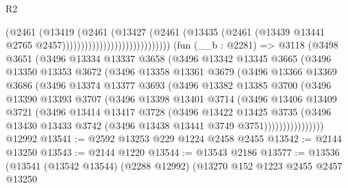 \begin{lexlean}{R2}
\begin{coremodule}
                                              (@2461
                                                (@13419
                                                  (@2461
                                                    (@13427
                                                      (@2461
                                                        (@13435
                                                          (@2461
                                                            (@13439
                                                              @13441
                                                              @2765
                                                              @2457)))))))))))))))))))))))))))))
    (fun (__b : @2281) =>
    @3118
      (@3498
        @3651
        (@3496
          @13334
          @13337
          @3658
          (@3496
            @13342
            @13345
            @3665
            (@3496
              @13350
              @13353
              @3672
              (@3496
                @13358
                @13361
                @3679
                (@3496
                  @13366
                  @13369
                  @3686
                  (@3496
                    @13374
                    @13377
                    @3693
                    (@3496
                      @13382
                      @13385
                      @3700
                      (@3496
                        @13390
                        @13393
                        @3707
                        (@3496
                          @13398
                          @13401
                          @3714
                          (@3496
                            @13406
                            @13409
                            @3721
                            (@3496
                              @13414
                              @13417
                              @3728
                              (@3496
                                @13422
                                @13425
                                @3735
                                (@3496
                                  @13430
                                  @13433
                                  @3742
                                  (@3496 @13438 @13441 @3749 @3751))))))))))))))))
    @12992
@13541 := @2592 @13253 @229 @1224 @2458 @2455
@13542 := @2144 @13250
@13543 := @2144 @1220
@13544 := @13543 @2186
@13577 := @13536
    (@13541
      (@13542 @13544)
      (@2288 @12992)
      (@13270
        @152
        @1223
        @2455
        @2457
        @13250

\end{coremodule}
\end{lexlean}
